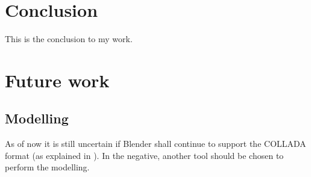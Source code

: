 \section{Conclusion}
This is the conclusion to my work.

\section{Future work}
\subsection{Modelling}
As of now it is still uncertain if Blender shall continue to support the COLLADA format (as explained in \cite{blender_roadmap}). In the negative, another tool should be chosen to perform the modelling.